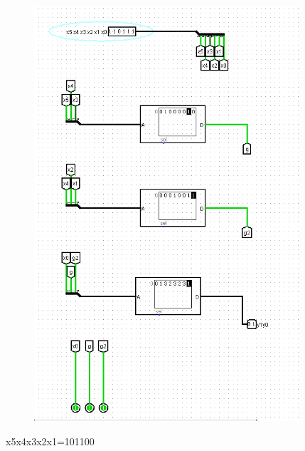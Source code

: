 \documentclass[]{article}
\begin{document}
\begin{figure}[H]
	\centering
	\includegraphics[width=0.88\textwidth]{test3_110111.png}
\end{figure}
\newpage
x5x4x3x2x1=101100
\end{document}

